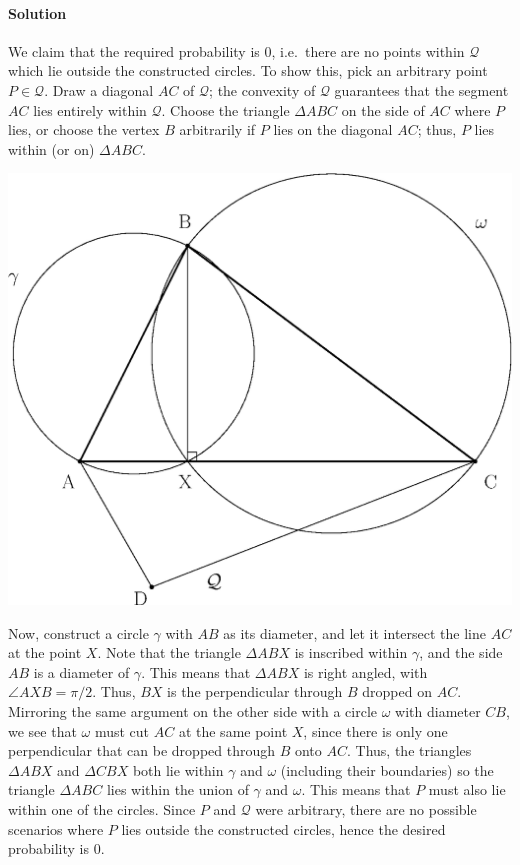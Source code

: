 \documentclass[10pt]{article}
\newcounter{prob}
\def\solution{\paragraph{Solution}}
\begin{document}
        \solution We claim that the required probability is $0$, i.e.\ there are no
        points within $\mathcal{Q}$ which lie outside the constructed circles.  To
        show this, pick an arbitrary point $P \in \mathcal{Q}$. Draw a diagonal $AC$
        of $\mathcal{Q}$; the convexity of $\mathcal{Q}$ guarantees that the segment
        $AC$ lies entirely within $\mathcal{Q}$. Choose the triangle $\Delta ABC$ on
        the side of $AC$ where $P$ lies, or choose the vertex $B$ arbitrarily if $P$
        lies on the diagonal $AC$; thus, $P$ lies within (or on) $\Delta ABC$.
        \begin{center}
            \includegraphics[scale=0.7]{./2_2_1.eps}
        \end{center}
        Now, construct a circle $\gamma$ with $AB$ as its diameter, and let it
        intersect the line $AC$ at the point $X$.  Note that the triangle $\Delta
        ABX$ is inscribed within $\gamma$, and the side $AB$ is a diameter of
        $\gamma$. This means that $\Delta ABX$ is right angled, with $\angle AXB =
        \pi /2$. Thus, $BX$ is the perpendicular through $B$ dropped on $AC$.
        Mirroring the same argument on the other side with a circle $\omega$ with
        diameter $CB$, we see that $\omega$ must cut $AC$ at the same point $X$,
        since there is only one perpendicular that can be dropped through $B$ onto
        $AC$. Thus, the triangles $\Delta ABX$ and $\Delta CBX$ both lie within
        $\gamma$ and $\omega$ (including their boundaries) so the triangle $\Delta
        ABC$ lies within the union of $\gamma$ and $\omega$. This means that $P$
        must also lie within one of the circles. Since $P$ and $\mathcal{Q}$ were
        arbitrary, there are no possible scenarios where $P$ lies outside the
        constructed circles, hence the desired probability is $0$. \\
\end{document}
